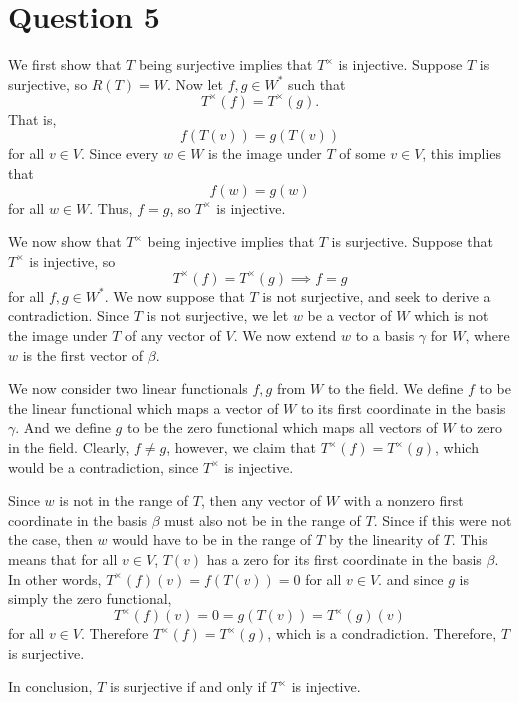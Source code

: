 \documentclass[12pt]{article}
\newcommand{\generic}[2]{\section*{#1}\begin{center}\framebox{\begin{minipage}{\textwidth-10pt}#2\end{minipage}}\end{center}}
\newcommand{\ques}[2]{\generic{Question #1}{#2}}
\begin{document}
\ques{5}{}

We first show that $T$ being surjective implies that $T^\times$ is injective. Suppose $T$ is surjective, so $R(T)=W$. Now let $f,g\in W^*$ such that
\[T^\times(f) = T^\times(g).\]
That is,
\[f(T(v)) = g(T(v))\]
for all $v\in V$. Since every $w\in W$ is the image under $T$ of some $v\in V$, this implies that
\[f(w) = g(w)\]
for all $w\in W$. Thus, $f=g$, so $T^\times$ is injective.

We now show that $T^\times$ being injective implies that $T$ is surjective. Suppose that $T^\times$ is injective, so
\[T^\times(f) = T^\times(g) \implies f=g\]
for all $f,g\in W^*$. We now suppose that $T$ is not surjective, and seek to derive a contradiction. Since $T$ is not surjective, we let $w$ be a vector of $W$ which is not the image under $T$ of any vector of $V$. We now extend $w$ to a basis $\gamma$ for $W$, where $w$ is the first vector of $\beta$.

We now consider two linear functionals $f,g$ from $W$ to the field. We define $f$ to be the linear functional which maps a vector of $W$ to its first coordinate in the basis $\gamma$. And we define $g$ to be the zero functional which maps all vectors of $W$ to zero in the field. Clearly, $f\ne g$, however, we claim that $T^\times(f)=T^\times(g)$, which would be a contradiction, since $T^\times$ is injective.

Since $w$ is not in the range of $T$, then any vector of $W$ with a nonzero first coordinate in the basis $\beta$ must also not be in the range of $T$. Since if this were not the case, then $w$ would have to be in the range of $T$ by the linearity of $T$. This means that for all $v\in V$, $T(v)$ has a zero for its first coordinate in the basis $\beta$. In other words, $T^\times(f)(v) = f(T(v)) = 0$ for all $v\in V$. and since $g$ is simply the zero functional,
\[T^\times(f)(v) = 0 = g(T(v)) = T^\times(g)(v)\]
for all $v\in V$. Therefore $T^\times(f)=T^\times(g)$, which is a condradiction. Therefore, $T$ is surjective.

In conclusion, $T$ is surjective if and only if $T^\times$ is injective.
\end{document}
